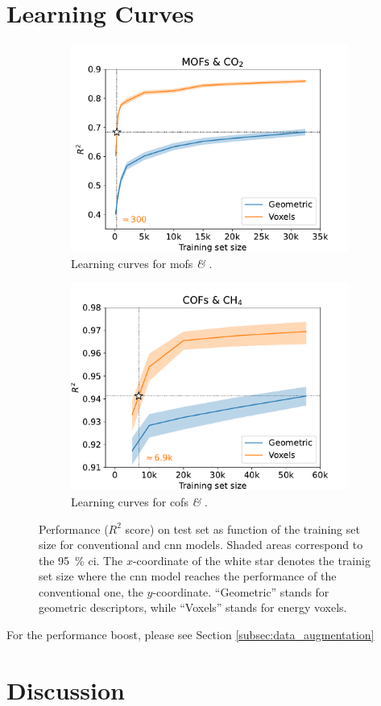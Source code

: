 \section{Learning Curves}

\begin{figure}
	\centering
	\begin{subfigure}[b]{0.49\textwidth}
		\includegraphics[width=\textwidth]{fig/learning_curves_mofs.pdf}
		\caption{Learning curves for \glspl{mof} \textit{\&} .}
		\label{fig:learning_curves_mofs}
	\end{subfigure}
	\begin{subfigure}[b]{0.49\textwidth}
		\includegraphics[width=\textwidth]{fig/learning_curves_cofs.pdf}
		\caption{Learning curves for \glspl{cof} \textit{\&} .}
		\label{fig:learning_curves_cofs}
	\end{subfigure}
	\caption[Learning curves.]{Performance ($R^2$ score) on test set as function
	of the training set size for conventional and \gls{cnn} models. Shaded areas
	correspond to the \SI{95}{\percent} \gls{ci}. The
	$x$-coordinate of the white star denotes the trainig set size where the
	\gls{cnn} model reaches the performance of the conventional one, the
	$y$-coordinate. ``Geometric'' stands for geometric descriptors, while
	``Voxels'' stands for energy voxels.}
	\label{fig:learning_curves}
\end{figure}

For the performance boost, please see Section \ref{subsec:data_augmentation}

\section{Discussion}
